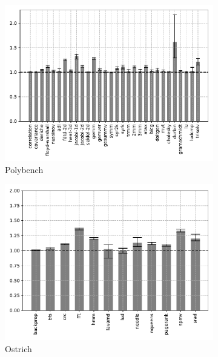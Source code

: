 \begin{figure}
    \centering
    \begin{subfigure}[t]{\textwidth}
        \includegraphics[width=\textwidth]
        {Images/6.1.RQ1/polybench-wasmtime-opt.pdf}
        \caption{Polybench}
    \end{subfigure}
    \begin{subfigure}[t]{.45\textwidth}
        \includegraphics[width=\textwidth]
        {Images/6.1.RQ1/ostrich-wasmtime-opt.pdf}
        \caption{Ostrich}
    \end{subfigure}
    \begin{subfigure}[t]{.45\textwidth}

\end{subfigure}
\end{figure}
